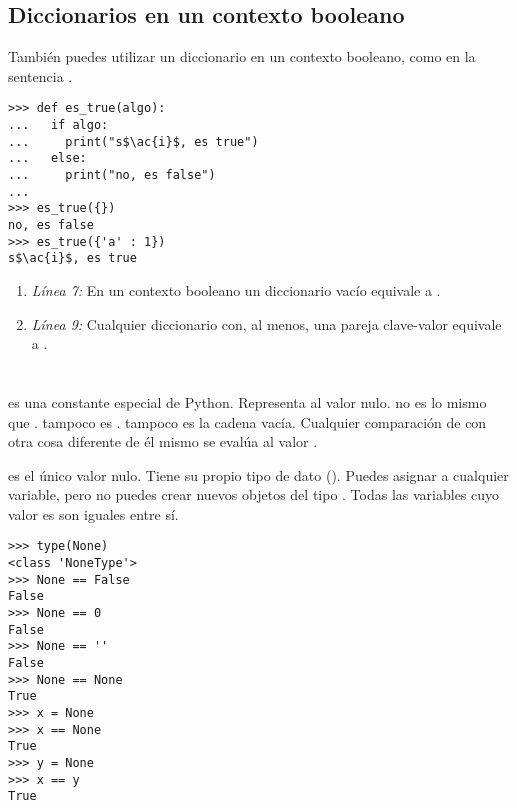 \subsection{Diccionarios en un contexto booleano}

También puedes utilizar un diccionario en un contexto booleano, como en la sentencia .


\noindent\begin{minipage}{\textwidth}
\begin{lstlisting}[mathescape=True]
>>> def es_true(algo):
...   if algo:
...     print("s$\ac{i}$, es true")
...   else:
...     print("no, es false")
...
>>> es_true({})
no, es false
>>> es_true({'a' : 1})
s$\ac{i}$, es true
\end{lstlisting}
\end{minipage}

\begin{enumerate}

\item \emph{Línea 7:} En un contexto booleano un diccionario vacío equivale a .

\item \emph{Línea 9:} Cualquier diccionario con, al menos, una pareja clave-valor equivale a .

\end{enumerate}

\section{}

 es una constante especial de Python. Representa al valor nulo.  no es lo mismo que .  tampoco es .  tampoco es la cadena vacía. Cualquier comparación de  con otra cosa diferente de él mismo se evalúa al valor .

 es el único valor nulo. Tiene su propio tipo de dato (). Puedes asignar  a cualquier variable, pero no puedes crear nuevos objetos del tipo . Todas las variables cuyo valor es  son iguales entre sí.

\noindent\begin{minipage}{\textwidth}
\begin{lstlisting}[mathescape=True]
>>> type(None)
<class 'NoneType'>
>>> None == False
False
>>> None == 0
False
>>> None == ''
False
>>> None == None
True
>>> x = None
>>> x == None
True
>>> y = None
>>> x == y
True
\end{lstlisting}
\end{minipage}

